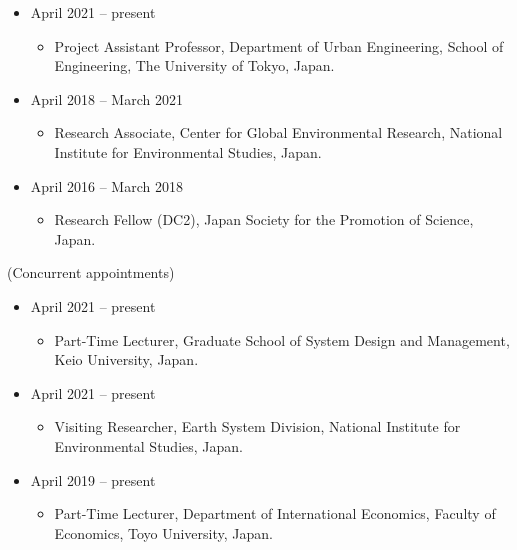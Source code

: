 \documentclass[]{book}
\providecommand{\tightlist}{%
  \setlength{\itemsep}{0pt}\setlength{\parskip}{0pt}}
\begin{document}
\begin{itemize}
\tightlist
\item
  April 2021 -- present

  \begin{itemize}
  \tightlist
  \item
    Project Assistant Professor,
    Department of Urban Engineering, School of Engineering, The University of Tokyo, Japan.
  \end{itemize}
\item
  April 2018 -- March 2021

  \begin{itemize}
  \tightlist
  \item
    Research Associate,
    Center for Global Environmental Research, National Institute for Environmental Studies, Japan.
  \end{itemize}
\item
  April 2016 -- March 2018

  \begin{itemize}
  \tightlist
  \item
    Research Fellow (DC2),
    Japan Society for the Promotion of Science, Japan.
  \end{itemize}
\end{itemize}

(Concurrent appointments)

\begin{itemize}
\tightlist
\item
  April 2021 -- present

  \begin{itemize}
  \tightlist
  \item
    Part-Time Lecturer,
    Graduate School of System Design and Management, Keio University, Japan.
  \end{itemize}
\item
  April 2021 -- present

  \begin{itemize}
  \tightlist
  \item
    Visiting Researcher,
    Earth System Division, National Institute for Environmental Studies, Japan.
  \end{itemize}
\item
  April 2019 -- present

  \begin{itemize}
  \tightlist
  \item
    Part-Time Lecturer,
    Department of International Economics, Faculty of Economics, Toyo University, Japan.
  \end{itemize}
\end{itemize}
\end{document}
